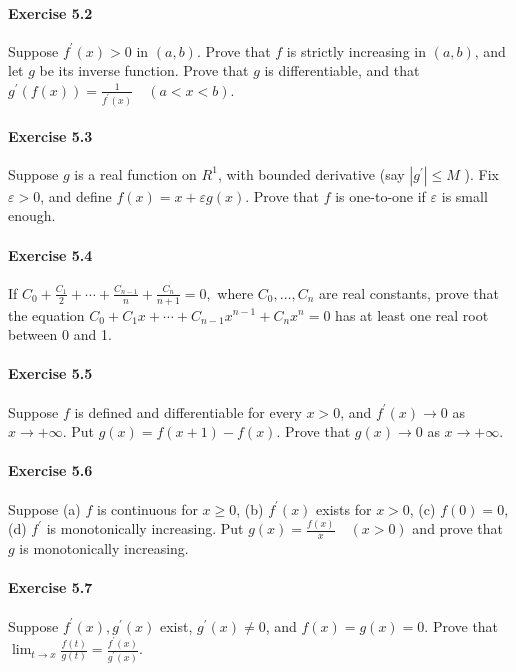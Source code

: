 \documentclass{article}
\theoremstyle{definition}
\begin{document}
\paragraph{Exercise 5.2} Suppose $f^{\prime}(x)>0$ in $(a, b)$. Prove that $f$ is strictly increasing in $(a, b)$, and let $g$ be its inverse function. Prove that $g$ is differentiable, and that $g^{\prime}(f(x))=\frac{1}{f^{\prime}(x)} \quad(a<x<b)$.

\paragraph{Exercise 5.3} Suppose $g$ is a real function on $R^{1}$, with bounded derivative (say $\left|g^{\prime}\right| \leq M$ ). Fix $\varepsilon>0$, and define $f(x)=x+\varepsilon g(x)$. Prove that $f$ is one-to-one if $\varepsilon$ is small enough.

\paragraph{Exercise 5.4} If $C_{0}+\frac{C_{1}}{2}+\cdots+\frac{C_{n-1}}{n}+\frac{C_{n}}{n+1}=0,$ where $C_{0}, \ldots, C_{n}$ are real constants, prove that the equation $C_{0}+C_{1} x+\cdots+C_{n-1} x^{n-1}+C_{n} x^{n}=0$ has at least one real root between 0 and 1.

\paragraph{Exercise 5.5} Suppose $f$ is defined and differentiable for every $x>0$, and $f^{\prime}(x) \rightarrow 0$ as $x \rightarrow+\infty$. Put $g(x)=f(x+1)-f(x)$. Prove that $g(x) \rightarrow 0$ as $x \rightarrow+\infty$.

\paragraph{Exercise 5.6} Suppose (a) $f$ is continuous for $x \geq 0$, (b) $f^{\prime}(x)$ exists for $x>0$, (c) $f(0)=0$, (d) $f^{\prime}$ is monotonically increasing. Put $g(x)=\frac{f(x)}{x} \quad(x>0)$ and prove that $g$ is monotonically increasing.

\paragraph{Exercise 5.7} Suppose $f^{\prime}(x), g^{\prime}(x)$ exist, $g^{\prime}(x) \neq 0$, and $f(x)=g(x)=0$. Prove that $\lim _{t \rightarrow x} \frac{f(t)}{g(t)}=\frac{f^{\prime}(x)}{g^{\prime}(x)}.$
\end{document}

